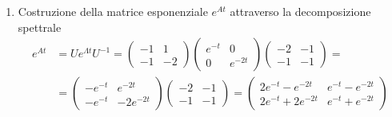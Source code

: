 \begin{enumerate}
\item Costruzione della matrice esponenziale $e^{At}$ attraverso la
decomposizione spettrale
$$\begin{aligned}
e^{At} &= Ue^{\Lambda t} U^{-1} = \begin{pmatrix}
                                    -1 & 1 \\
                                    -1 & -2
                                    \end{pmatrix} \begin{pmatrix}
                                                e^{-t} & 0 \\
                                                0 & e^{-2t}
                                                \end{pmatrix} \begin{pmatrix}
                                                -2 & -1 \\
                                                -1 & -1
                                                \end{pmatrix} = \\
    &= \begin{pmatrix}
        -e^{-t} & e^{-2t} \\
        -e^{-t} & -2e^{-2t}
        \end{pmatrix}\begin{pmatrix}
                    -2 & -1 \\
                    -1 & -1
                    \end{pmatrix} = \begin{pmatrix}
                                    2e^{-t}-e^{-2t} & e^{-t}-e^{-2t}\\
                                    2e^{-t}+2e^{-2t} & e^{-t}+e^{-2t}
                                    \end{pmatrix}
\end{aligned}$$
\end{enumerate}
